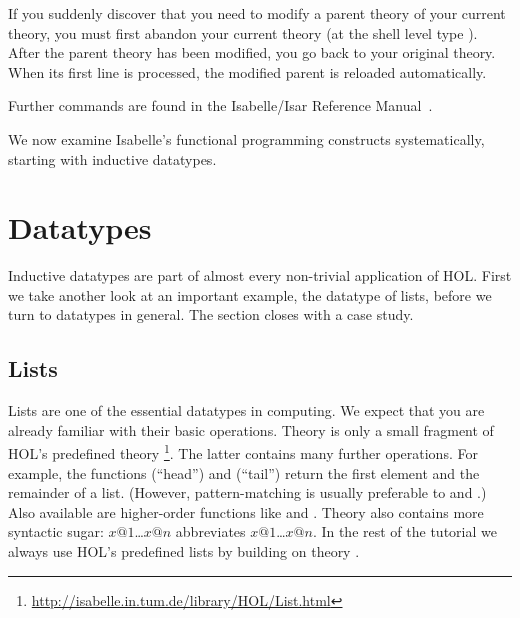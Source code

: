 \begin{description}
  If you suddenly discover that you need to modify a parent theory of your
  current theory, you must first abandon your current theory%
  (at the shell
  level type ). After the parent theory has
  been modified, you go back to your original theory. When its first line
   is processed, the
  modified parent is reloaded automatically.
  
\end{description}
Further commands are found in the Isabelle/Isar Reference
Manual~\cite{isabelle-isar-ref}.

We now examine Isabelle's functional programming constructs systematically,
starting with inductive datatypes.


\section{Datatypes}
\label{sec:datatype}

%
Inductive datatypes are part of almost every non-trivial application of HOL.
First we take another look at an important example, the datatype of
lists, before we turn to datatypes in general. The section closes with a
case study.


\subsection{Lists}

%
Lists are one of the essential datatypes in computing.  We expect that you
are already familiar with their basic operations.
Theory  is only a small fragment of HOL's predefined theory
\footnote{\url{http://isabelle.in.tum.de/library/HOL/List.html}}.
The latter contains many further operations. For example, the functions
 (``head'') and  (``tail'') return the first
element and the remainder of a list. (However, pattern-matching is usually
preferable to  and .)  
Also available are higher-order functions like  and .
Theory  also contains
more syntactic sugar: \isa{[}$x@1$\isa{,}\dots\isa{,}$x@n$\isa{]} abbreviates
$x@1$\isa{\#}\dots\isa{\#}$x@n$\isa{\#[]}.  In the rest of the tutorial we
always use HOL's predefined lists by building on theory .


